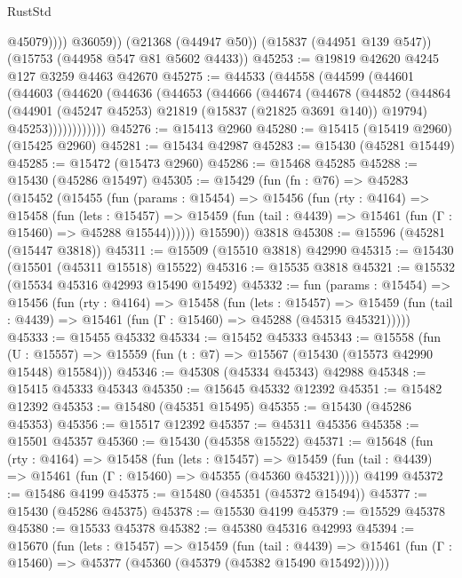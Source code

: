 \begin{lexlean}{RustStd}
\begin{coremodule}
                @45079))))
        @36059))
    (@21368 (@44947 @50))
    (@15837 (@44951 @139 @547))
    (@15753 (@44958 @547 @81 @5602 @4433))
@45253 := @19819 @42620 @4245 @127 @3259 @4463 @42670
@45275 := @44533
    (@44558
      (@44599
        (@44601
          (@44603
            (@44620
              (@44636
                (@44653
                  (@44666
                    (@44674
                      (@44678
                        (@44852
                          (@44864
                            (@44901 (@45247 @45253) @21819 (@15837 (@21825 @3691 @140)) @19794)
                            @45253))))))))))))
@45276 := @15413 @2960
@45280 := @15415 (@15419 @2960) (@15425 @2960)
@45281 := @15434 @42987
@45283 := @15430 (@45281 @15449)
@45285 := @15472 (@15473 @2960)
@45286 := @15468 @45285
@45288 := @15430 (@45286 @15497)
@45305 := @15429
    (fun (fn : @76) =>
    @45283
      (@15452
        (@15455
          (fun (params : @15454) =>
          @15456
            (fun (rty : @4164) =>
            @15458
              (fun (lets : @15457) =>
              @15459 (fun (tail : @4439) => @15461 (fun (Γ : @15460) => @45288 @15544))))))
        @15590))
    @3818
@45308 := @15596 (@45281 (@15447 @3818))
@45311 := @15509 (@15510 @3818) @42990
@45315 := @15430 (@15501 (@45311 @15518) @15522)
@45316 := @15535 @3818
@45321 := @15532 (@15534 @45316 @42993 @15490 @15492)
@45332 := fun (params : @15454) =>
  @15456
    (fun (rty : @4164) =>
    @15458
      (fun (lets : @15457) =>
      @15459 (fun (tail : @4439) => @15461 (fun (Γ : @15460) => @45288 (@45315 @45321)))))
@45333 := @15455 @45332
@45334 := @15452 @45333
@45343 := @15558
    (fun (U : @15557) => @15559 (fun (t : @7) => @15567 (@15430 (@15573 @42990 @15448) @15584)))
@45346 := @45308 (@45334 @45343) @42988
@45348 := @15415 @45333 @45343
@45350 := @15645 @45332 @12392
@45351 := @15482 @12392
@45353 := @15480 (@45351 @15495)
@45355 := @15430 (@45286 @45353)
@45356 := @15517 @12392
@45357 := @45311 @45356
@45358 := @15501 @45357
@45360 := @15430 (@45358 @15522)
@45371 := @15648
    (fun (rty : @4164) =>
    @15458
      (fun (lets : @15457) =>
      @15459 (fun (tail : @4439) => @15461 (fun (Γ : @15460) => @45355 (@45360 @45321)))))
    @4199
@45372 := @15486 @4199
@45375 := @15480 (@45351 (@45372 @15494))
@45377 := @15430 (@45286 @45375)
@45378 := @15530 @4199
@45379 := @15529 @45378
@45380 := @15533 @45378
@45382 := @45380 @45316 @42993
@45394 := @15670
    (fun (lets : @15457) =>
    @15459
      (fun (tail : @4439) =>
      @15461 (fun (Γ : @15460) => @45377 (@45360 (@45379 (@45382 @15490 @15492))))))

\end{coremodule}
\end{lexlean}
